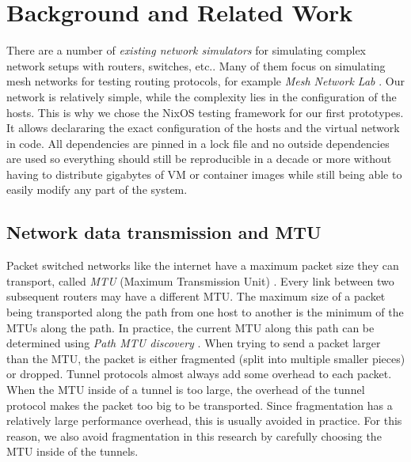 
\chapter{Background and Related Work}
\label{chap:background}


There are a number of \textit{existing network simulators} \cite{network-simulators-list} for simulating complex network setups with routers, switches, etc..
Many of them focus on simulating mesh networks for testing routing protocols, for example \textit{Mesh Network Lab} \cite{meshnet-lab}.
Our network is relatively simple, while the complexity lies in the configuration of the hosts.
This is why we chose the NixOS testing framework for our first prototypes.
It allows declararing the exact configuration of the hosts and the virtual network in code.
All dependencies are pinned in a lock file and no outside dependencies are used so everything should still be reproducible in a decade or more without having to distribute gigabytes of VM or container images while still being able to easily modify any part of the system.

\section{Network data transmission and MTU}
Packet switched networks like the internet have a maximum packet size they can transport, called \textit{MTU} (Maximum Transmission Unit) \cite{wiki:Maximum_transmission_unit}.
Every link between two subsequent routers may have a different MTU.
The maximum size of a packet being transported along the path from one host to another is the minimum of the MTUs along the path.
In practice, the current MTU along this path can be determined using \textit{Path MTU discovery} \cite{wiki:Path_MTU_Discovery}.
When trying to send a packet larger than the MTU, the packet is either fragmented (split into multiple smaller pieces) or dropped.
Tunnel protocols almost always add some overhead to each packet.
When the MTU inside of a tunnel is too large, the overhead of the tunnel protocol makes the packet too big to be transported.
Since fragmentation has a relatively large performance overhead, this is usually avoided in practice.
For this reason, we also avoid fragmentation in this research by carefully choosing the MTU inside of the tunnels.

